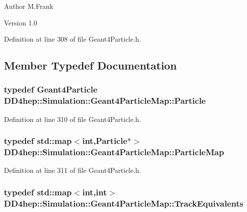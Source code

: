 \begin{DoxyAuthor}{Author}
M.Frank 
\end{DoxyAuthor}
\begin{DoxyVersion}{Version}
1.0 
\end{DoxyVersion}


Definition at line 308 of file Geant4Particle.h.

\subsection{Member Typedef Documentation}
\hypertarget{class_d_d4hep_1_1_simulation_1_1_geant4_particle_map_a01ed68f2fc2e55ecf936e5ac3e6eae5f}{
\subsubsection[{Particle}]{\setlength{\rightskip}{0pt plus 5cm}typedef {\bf Geant4Particle} {\bf DD4hep::Simulation::Geant4ParticleMap::Particle}}}
\label{class_d_d4hep_1_1_simulation_1_1_geant4_particle_map_a01ed68f2fc2e55ecf936e5ac3e6eae5f}


Definition at line 310 of file Geant4Particle.h.\hypertarget{class_d_d4hep_1_1_simulation_1_1_geant4_particle_map_a065c5fb0629285022b9aa2a628bffef3}{
\subsubsection[{ParticleMap}]{\setlength{\rightskip}{0pt plus 5cm}typedef std::map$<$int,{\bf Particle}$\ast$$>$ {\bf DD4hep::Simulation::Geant4ParticleMap::ParticleMap}}}
\label{class_d_d4hep_1_1_simulation_1_1_geant4_particle_map_a065c5fb0629285022b9aa2a628bffef3}


Definition at line 311 of file Geant4Particle.h.\hypertarget{class_d_d4hep_1_1_simulation_1_1_geant4_particle_map_aba09f5fcb2dd5874d129660ad4454a21}{
\subsubsection[{TrackEquivalents}]{\setlength{\rightskip}{0pt plus 5cm}typedef std::map$<$int,int$>$ {\bf DD4hep::Simulation::Geant4ParticleMap::TrackEquivalents}}}
\label{class_d_d4hep_1_1_simulation_1_1_geant4_particle_map_aba09f5fcb2dd5874d129660ad4454a21}



